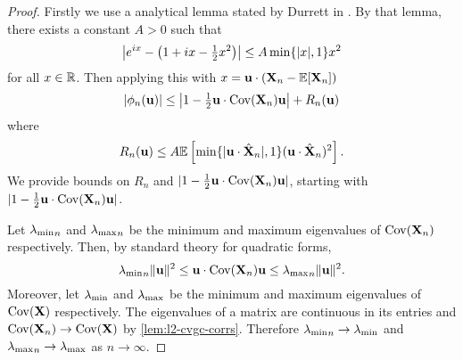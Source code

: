 \begin{proof}
    Firstly we use a analytical lemma stated by Durrett in \cite[P.116, Lemma 3.3.19]{durrettProbabilityTheoryExamples2019}. By that lemma, there exists a constant $A > 0$ such that 
    \begin{equation*}
        \abs*{e^{ix} - \left(1 + i x - \tfrac{1}{2}x^2\right)} \leq A \min\{\abs{x}, 1\} x^2
    \end{equation*}
    for all $x \in \R$. Then applying this with $x = \vu \cdot (\vX_n - \E[\vX_n])$
    \begin{equation*}
        \abs{\phi_n(\vu)}
        \leq \abs*{1 - \tfrac{1}{2} \vu \cdot \cov(\vX_n) \vu } + R_n(\vu)
    \end{equation*}
    where
    \begin{equation*}
        R_n(\vu) \leq A \E\left[ 
            \min\{\abs{\vu \cdot \hat{\vX}_n}, 1\} (\vu \cdot \hat{\vX}_n)^2
        \right].
    \end{equation*}
    We provide bounds on $R_n$ and $\abs{1 - \frac{1}{2} \vu \cdot \cov(\vX_n) \vu}$, starting with $\abs{1 - \frac{1}{2} \vu \cdot \cov(\vX_n) \vu}$.

    Let $\mineval_n$ and $\maxeval_n$ be the minimum and maximum eigenvalues of $\cov(\vX_n)$ respectively. Then, by standard theory for quadratic forms,
    \begin{equation*}
        \mineval_n \norm{\vu}^2
        \leq \vu \cdot \cov(\vX_n) \vu
        \leq \maxeval_n \norm{\vu}^2.
    \end{equation*}
    Moreover, let $\mineval$ and $\maxeval$ be the minimum and maximum eigenvalues of $\cov(\vX)$ respectively. The eigenvalues of a matrix are continuous in its entries and $\cov(\vX_n) \to \cov(\vX)$ by \cref{lem:l2-cvgc-corrs}. Therefore $\mineval_n \to \mineval$ and $\maxeval_n \to \maxeval$ as $n \to \infty$.


\end{proof}
